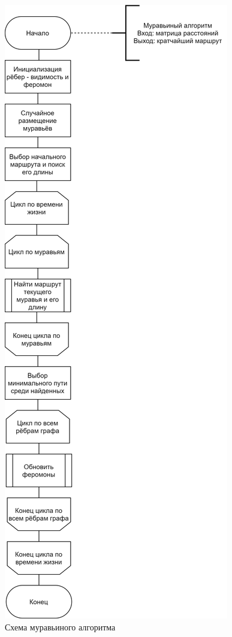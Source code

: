 \documentclass[12pt]{report}
\begin{document}
\begin{figure}[H]
		\centering
		\includegraphics[scale=0.7]{report_files/dg-ant.png}
		\caption{Схема муравьиного алгоритма}
		\label{fig:ant}
\end{figure}
\end{document}
